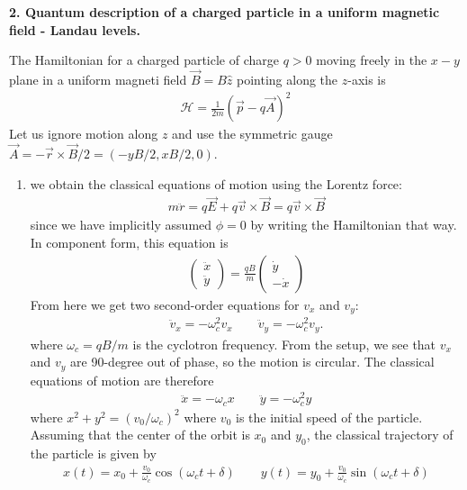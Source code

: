 \documentclass{article}
\theoremstyle{definition}
\newcommand{\ham}{\mathcal{H}}
\newcommand{\f}[2]{\frac{#1}{#2}}
\newcommand{\lp}{\left(}
\newcommand{\rp}{\right)}
\begin{document}
\noindent \textbf{2. Quantum description of a charged particle in a uniform magnetic field - Landau levels.}

\noindent The Hamiltonian for a charged particle of charge $q>0$ moving freely in the $x-y$ plane in a uniform magneti field $\vec{B} = B\hat{z}$ pointing along the $z$-axis is
\begin{align*}
	\ham = \f{1}{2m}\lp \vec{p} - q\vec{A} \rp^2
\end{align*}
Let us ignore motion along $z$ and use the symmetric gauge $\vec{A} = -\vec{r}\times \vec{B}/2 = (-yB/2, xB/2,0)$. 

\begin{enumerate}[label=\alph*)]
	
	\item we obtain the classical equations of motion using the Lorentz force:
	\begin{align*}
		m\ddot{r} = q\vec{E} + q \vec{v}\times \vec{B} = q \vec{v} \times \vec{B}
	\end{align*}
	since we have implicitly assumed $\phi = 0$ by writing the Hamiltonian that way. In component form, this equation is 
	\begin{align*}
		\begin{pmatrix}
			\ddot{x} \\ \ddot{y}
		\end{pmatrix}
	= \f{qB}{m}\begin{pmatrix}
		\dot{y} \\ -\dot{x}  
	\end{pmatrix} 
	\end{align*}
	From here we get two second-order equations for $v_x$ and $v_y$: 
	\begin{align*}
		\ddot{v}_x = -\omega_c^2 v_x \quad\quad \ddot{v}_y = -\omega_c^2 v_y.
	\end{align*}
	where $\omega_c = qB/m$ is the cyclotron frequency. From the setup, we see that $v_x$ and $v_y$ are 90-degree out of phase, so the motion is circular. The classical equations of motion are therefore
	\begin{align*}
		\ddot{x} = -\omega_c x \quad\quad \ddot{y} = -\omega_c^2 y 
	\end{align*}
	where $x^2 + y^2 = (v_0/\omega_c)^2 $ where $v_0$ is the initial speed of the particle. Assuming that the center of the orbit is $x_0$ and $y_0$, the classical trajectory of the particle is given by 
	\begin{align*}
		x(t) = x_0 + \f{v_0}{\omega_c}\cos(\omega_c t + \delta) \quad\quad 
		y(t) = y_0 + \f{v_0}{\omega_c}\sin(\omega_c t + \delta)
	\end{align*}


\end{enumerate}
\end{document}
